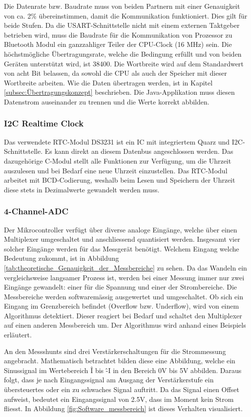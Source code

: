 Die Datenrate bzw. Baudrate muss von beiden Partnern mit einer Genauigkeit von ca. 2\% übereinstimmen, damit die Kommunikation funktioniert. Dies gilt für beide Stufen. Da die USART-Schnittstelle nicht mit einem externen Taktgeber betrieben wird, muss die Baudrate für die Kommunikation von Prozessor zu Bluetooth Modul ein ganzzahliger Teiler der CPU-Clock (16 MHz) sein. Die höchstmögliche Übertragungsrate, welche die Bedingung erfüllt und von beiden Geräten unterstützt wird, ist 38400. Die Wortbreite wird auf dem Standardwert von acht Bit belassen, da sowohl die CPU als auch der Speicher mit dieser Wortbreite arbeiten.
Wie die Daten übertragen werden, ist in Kapitel \ref{subsec:Übertragungskonzept} beschrieben. Die Java-Applikation muss diesen Datenstrom auseinander zu trennen und die Werte korrekt abbilden.  

\subsubsection*{I2C Realtime Clock}
Das verwendete RTC-Modul DS3231 ist ein IC mit integriertem Quarz und I2C-Schnittstelle. Es kann direkt an diesem Datenbus angeschlossen werden. Das dazugehörige C-Modul stellt alle Funktionen zur Verfügung, um die Uhrzeit auszulesen und bei Bedarf eine neue Uhrzeit einzustellen. Das RTC-Modul arbeitet mit BCD-Codierung, weshalb beim Lesen und Speichern der Uhrzeit diese stets in Dezimalwerte gewandelt werden muss.

\subsubsection*{4-Channel-ADC}
Der Mikrocontroller verfügt über diverse analoge Eingänge, welche über einen Multiplexer umgeschaltet und anschliessend quantisiert werden. Insgesamt vier solcher Eingänge werden für das Messgerät benötigt. Welchem Eingang welche Bedeutung zukommt, ist in Abbildung \ref{tab:theoretische_Genauigkeit_der_Messbereiche} zu sehen. Da das Wandeln ein vergleichsweise langsamer Prozess ist, werden bei einer Messung immer nur zwei Eingänge gewandelt: einer für die Spannung und einer der Strombereiche. Die Messbereiche werden softwaremässig ausgewertet und umgeschaltet. Ob sich ein Eingang im Grenzbereich befindet (Overflow bzw. Underflow), wird von einem Algorithmus detektiert. Dieser reagiert bei Bedarf und schaltet den Multiplexer auf einen anderen Messbereich um. Der Algorithmus wird anhand eines Beispiels erläutert.

An den Messshunts sind drei Verstärkerschaltungen für die Strommessung angebracht. Mathematisch betrachtet bilden diese eine Abbildung, welche ein Sinussignal im Wertebereich \^I bis \^{-I} in den Bereich 0V bis 5V abbilden. Daraus folgt, dass je nach Eingangssignal am Ausgang der Verstärkerstufe ein übersteuertes oder ein zu schwaches Signal auftritt. Da das Signal einen Offset aufweist, bedeutet ein Eingangssignal von 2.5V, dass im Moment kein Strom fliesst. In Abbildung \ref{fig:Software_messbereich} ist dieses Verhalten visualisiert.


